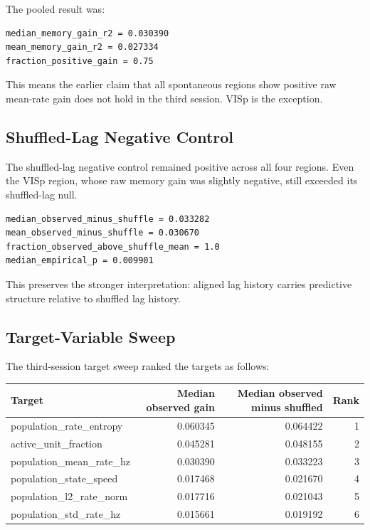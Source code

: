 The pooled result was:

\begin{verbatim}
median_memory_gain_r2 = 0.030390
mean_memory_gain_r2 = 0.027334
fraction_positive_gain = 0.75
\end{verbatim}

This means the earlier claim that all spontaneous regions show positive raw mean-rate gain does not hold in the third session. VISp is the exception.

\subsection{Shuffled-Lag Negative Control}

The shuffled-lag negative control remained positive across all four regions. Even the VISp region, whose raw memory gain was slightly negative, still exceeded its shuffled-lag null.

\begin{verbatim}
median_observed_minus_shuffle = 0.033282
mean_observed_minus_shuffle = 0.030670
fraction_observed_above_shuffle_mean = 1.0
median_empirical_p = 0.009901
\end{verbatim}

This preserves the stronger interpretation: aligned lag history carries predictive structure relative to shuffled lag history.

\subsection{Target-Variable Sweep}

The third-session target sweep ranked the targets as follows:

\begin{center}
\begin{tabular}{lrrr}
\hline
Target & Median observed gain & Median observed minus shuffled & Rank \\
\hline
population\_rate\_entropy & 0.060345 & 0.064422 & 1 \\
active\_unit\_fraction & 0.045281 & 0.048155 & 2 \\
population\_mean\_rate\_hz & 0.030390 & 0.033223 & 3 \\
population\_state\_speed & 0.017468 & 0.021670 & 4 \\
population\_l2\_rate\_norm & 0.017716 & 0.021043 & 5 \\
population\_std\_rate\_hz & 0.015661 & 0.019192 & 6 \\
\hline
\end{tabular}
\end{center}


